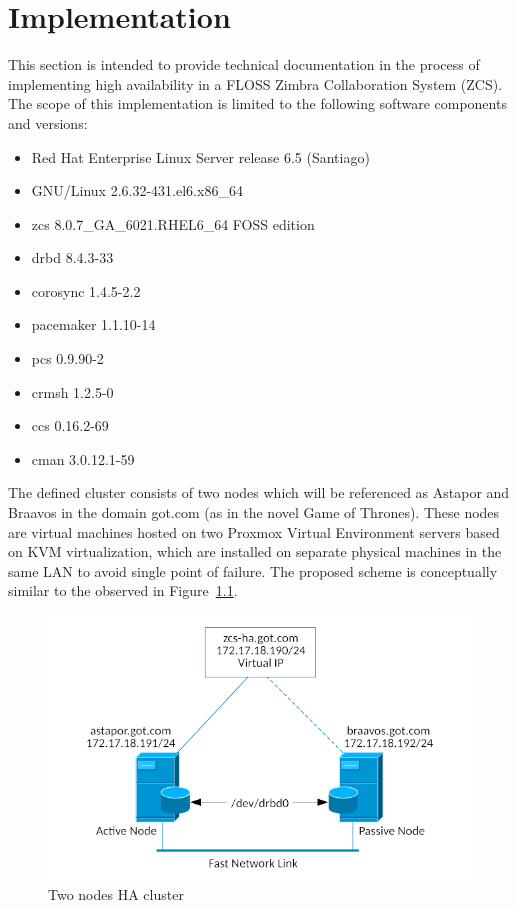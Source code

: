 \documentclass[a4paper, 12pt]{book}
\begin{document}
%
\chapter{Implementation}
\label{chap:implementation}

This section is intended to provide technical documentation in the process of implementing high availability in a FLOSS Zimbra Collaboration System (ZCS). The scope of this implementation is limited to the following software components and versions:
\begin{itemize}
	\setlength{\itemsep}{0pt}
	\item Red Hat Enterprise Linux Server release 6.5 (Santiago)
	\item GNU/Linux 2.6.32-431.el6.x86\_64
	\item zcs 8.0.7\_GA\_6021.RHEL6\_64 FOSS edition
	\item drbd 8.4.3-33
	\item corosync 1.4.5-2.2
	\item pacemaker 1.1.10-14
	\item pcs 0.9.90-2
	\item crmsh 1.2.5-0
	\item ccs 0.16.2-69
	\item cman 3.0.12.1-59
\end{itemize}

\noindent The defined cluster consists of two nodes which will be referenced as Astapor and Braavos in the domain got.com (as in the novel Game of Thrones). These nodes are virtual machines hosted on two Proxmox Virtual Environment servers based on KVM virtualization, which are installed on separate physical machines in the same LAN to avoid single point of failure. The proposed scheme is conceptually similar to the observed in Figure~\ref{fig:ha-cluster}.

\begin{figure}[H]
  \centering
  \includegraphics[scale=0.50]{two_nodes_ha_cluster.png}
  \caption[Two nodes HA cluster]{Two nodes HA cluster}
  \label{fig:ha-cluster}
\end{figure}
\end{document}
